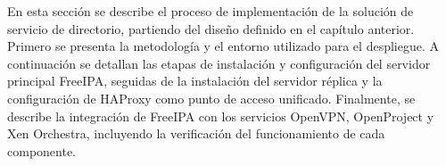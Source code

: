 \label{cap:implementacio}
\vspace*{0.7cm}

En esta sección se describe el proceso de implementación de la solución de servicio de directorio, partiendo del diseño definido en el capítulo anterior. Primero se presenta la metodología y el entorno utilizado para el despliegue. A continuación se detallan las etapas de instalación y configuración del servidor principal FreeIPA, seguidas de la instalación del servidor réplica y la configuración de HAProxy como punto de acceso unificado. Finalmente, se describe la integración de FreeIPA con los servicios OpenVPN, OpenProject y Xen Orchestra, incluyendo la verificación del funcionamiento de cada componente.








